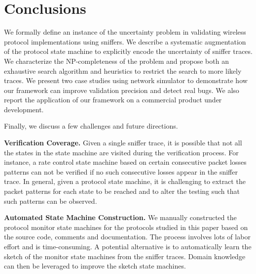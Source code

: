 \section{Conclusions}
\label{sec:conclusion}

We formally define an instance of the uncertainty problem in validating wireless protocol
implementations using sniffers. We describe a systematic augmentation of the
protocol state machine to explicitly encode the uncertainty of sniffer traces.
We characterize the NP-completeness of the problem and propose both an
exhaustive search algorithm and heuristics to restrict the search to more likely
traces. We present two case studies using \ns{} network simulator to demonstrate
how our framework can improve validation precision and detect real bugs. We also
report the application of our framework on a commercial product under
development.

Finally, we discuss a few challenges and future
directions.

\textbf{Verification Coverage.} Given a single sniffer trace, it is possible
that not all the states in the state machine are visited during the verification
process. For instance, a rate control state machine based on certain consecutive
packet losses patterns can not be verified if no such consecutive losses appear
in the sniffer trace. In general, given a protocol state machine, it is
challenging to extract the packet patterns for each state to be reached and to
alter the testing such that such patterns can be observed.

\textbf{Automated State Machine Construction.} We manually constructed the
protocol monitor state machines for the protocols studied in this paper based on
the source code, comments and documentation. The process involves lots of labor
effort and is time-consuming. A potential alternative is to automatically learn
the sketch of the monitor state machines from the sniffer traces. Domain
knowledge can then be leveraged to improve the sketch state machines.
